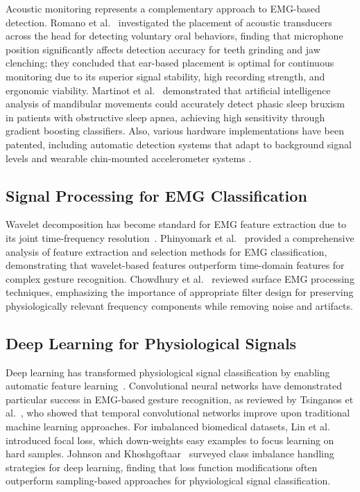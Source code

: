 \documentclass[pdflatex,sn-vancouver-num, iicol]{sn-jnl}
\begin{document}
Acoustic monitoring represents a complementary approach to EMG-based detection. Romano et al.~\cite{romano2024wearable} investigated the placement of acoustic transducers across the head for detecting voluntary oral behaviors, finding that microphone position significantly affects detection accuracy for teeth grinding and jaw clenching; they concluded that ear-based placement is optimal for continuous monitoring due to its superior signal stability, high recording strength, and ergonomic viability.  Martinot et al.~\cite{martinot2021artificial} demonstrated that artificial intelligence analysis of mandibular movements could accurately detect phasic sleep bruxism in patients with obstructive sleep apnea, achieving high sensitivity through gradient boosting classifiers. Also, various hardware implementations have been patented, including automatic detection systems that adapt to background signal levels \cite{haugland2020automatic} and wearable chin-mounted accelerometer systems \cite{patwa2017bruxism}.

\subsection{Signal Processing for EMG Classification}

Wavelet decomposition has become standard for EMG feature extraction due to its joint time-frequency resolution~\cite{englehart2003robust}. Phinyomark et al.~\cite{phinyomark2012feature} provided a comprehensive analysis of feature extraction and selection methods for EMG classification, demonstrating that wavelet-based features outperform time-domain features for complex gesture recognition. Chowdhury et al.~\cite{chowdhury2013surface} reviewed surface EMG processing techniques, emphasizing the importance of appropriate filter design for preserving physiologically relevant frequency components while removing noise and artifacts.

\subsection{Deep Learning for Physiological Signals}

Deep learning has transformed physiological signal classification by enabling automatic feature learning~\cite{faust2018deep}. Convolutional neural networks have demonstrated particular success in EMG-based gesture recognition, as reviewed by Tsinganos et al.~\cite{tsinganos2019improved}, who showed that temporal convolutional networks improve upon traditional machine learning approaches. For imbalanced biomedical datasets, Lin et al.~\cite{lin2017focal} introduced focal loss, which down-weights easy examples to focus learning on hard samples. Johnson and Khoshgoftaar~\cite{johnson2019survey} surveyed class imbalance handling strategies for deep learning, finding that loss function modifications often outperform sampling-based approaches for physiological signal classification.
\end{document}
